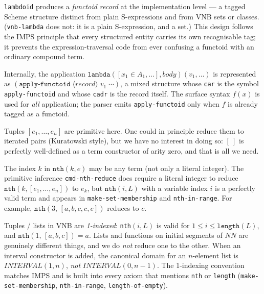 \begin{remark}
\texttt{lambdoid} produces a \emph{functoid record} at the implementation
level --- a tagged Scheme structure distinct from plain S-expressions and from
VNB sets or classes.  (\texttt{vnb-lambda} does not: it is a plain
S-expression, and a set.)  This design follows the IMPS
principle that every structured entity carries its own recognisable tag; it
prevents the expression-traversal code from ever confusing a functoid with an
ordinary compound term.

Internally, the application
$\texttt{lambda}([x_1 \in A_1,\ldots], \mathit{body})(v_1,\ldots)$
is represented as
$(\texttt{apply-functoid}\;\langle\textit{record}\rangle\;v_1\;\cdots)$,
a mixed structure whose \texttt{car} is the symbol \texttt{apply-functoid}
and whose \texttt{cadr} is the record itself.  The surface syntax
$f(x)$ is used for \emph{all} application; the parser emits
\texttt{apply-functoid} only when $f$ is already tagged as a functoid.
\end{remark}

\begin{remark}
Tuples $[e_1,\ldots,e_n]$ are primitive here.  One could in principle reduce
them to iterated pairs (Kuratowski style), but we have no interest in doing so:
$[\ ]$ is perfectly well-defined as a term constructor of arity zero, and that
is all we need.
\end{remark}

\begin{remark}
The index $k$ in $\texttt{nth}(k, e)$ may be any term (not only a literal
integer).  The primitive inference \texttt{cmd-nth-reduce} does require a
literal integer to reduce $\texttt{nth}(k, [e_1,\ldots,e_n])$ to $e_k$, but
$\texttt{nth}(i, L)$ with a variable index $i$ is a perfectly valid term and
appears in \texttt{make-set-membership} and \texttt{nth-in-range}.
For example, $\texttt{nth}(3,\,[a,b,c,c,e])$ reduces to $c$.
\end{remark}

\begin{remark}
Tuples / lists in VNB are \emph{1-indexed}: \texttt{nth}$(i, L)$ is valid
for $1 \le i \le \texttt{length}(L)$, and $\texttt{nth}(1,\,[a, b, c]) = a$.
Lists and functions on initial segments of $\mathit{NN}$ are genuinely
different things, and we do \emph{not} reduce one to the other.  When an
interval constructor is added, the canonical domain for an $n$-element list
is $\mathit{INTERVAL}(1, n)$, \emph{not} $\mathit{INTERVAL}(0, n-1)$.
The 1-indexing convention matches IMPS and is built into every axiom
that mentions \texttt{nth} or \texttt{length} (\texttt{make-set-membership},
\texttt{nth-in-range}, \texttt{length-of-empty}).
\end{remark}


